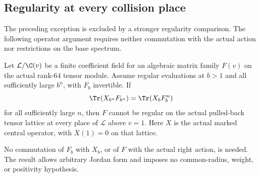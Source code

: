 \subsection{Regularity at every collision place}
The preceding exception is excluded by a stronger
regularity comparison. The following operator argument
requires neither commutation with the actual action
nor restrictions on the base spectrum.

\begin{finding}
\label{f:allplacestrace}
Let $\mathcal L/\C(v)$ be a finite coefficient field
for an algebraic matrix family $F(v)$ on the actual
rank-$64$ tensor module.
Assume regular evaluations at $b>1$ and all
sufficiently large $b^n$, with $F_b$ invertible.
If
\[
 \Tr(X_{b^n}F_{b^n})=\Tr(X_bF_b^n)
\]
for all sufficiently large $n$, then $F$ cannot be
regular on the actual pulled-back tensor lattice
at every place of $\mathcal L$ above $v=1$.
Here $X$ is the actual marked central operator,
with $X(1)=0$ on that lattice.

No commutation of $F_b$ with $X_b$, or of $F$ with
the actual right action, is needed.
The result allows arbitrary Jordan form and imposes
no common-radius, weight, or positivity hypothesis.
\end{finding}

